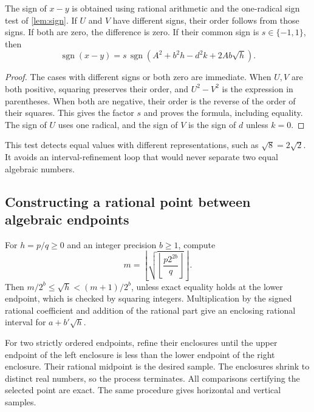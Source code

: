 \begin{lemma}\label{lem:two-radicals}
The sign of $x-y$ is obtained using rational arithmetic and the one-radical sign test of \cref{lem:sign}. If $U$ and $V$ have different signs, their order follows from those signs. If both are zero, the difference is zero. If their common sign is $s\in\{-1,1\}$, then
\begin{equation}\label{eq:two-radical-comparison}
\operatorname{sgn}(x-y)=s\,\operatorname{sgn}\left(A^2+b^2h-d^2k+2Ab\sqrt h\right).
\end{equation}
\end{lemma}
\begin{proof}
The cases with different signs or both zero are immediate. When $U,V$ are both positive, squaring preserves their order, and $U^2-V^2$ is the expression in parentheses. When both are negative, their order is the reverse of the order of their squares. This gives the factor $s$ and proves the formula, including equality. The sign of $U$ uses one radical, and the sign of $V$ is the sign of $d$ unless $k=0$.
\end{proof}

This test detects equal values with different representations, such as $\sqrt8=2\sqrt2$. It avoids an interval-refinement loop that would never separate two equal algebraic numbers.

\subsection{Constructing a rational point between algebraic endpoints}
For $h=p/q\ge0$ and an integer precision $b\ge1$, compute
\[
m=\left\lfloor\sqrt{\left\lfloor\frac{p2^{2b}}q\right\rfloor}\right\rfloor.
\]
Then $m/2^b\le\sqrt h<(m+1)/2^b$, unless exact equality holds at the lower endpoint, which is checked by squaring integers. Multiplication by the signed rational coefficient and addition of the rational part give an enclosing rational interval for $a+b'\sqrt h$.

For two strictly ordered endpoints, refine their enclosures until the upper endpoint of the left enclosure is less than the lower endpoint of the right enclosure. Their rational midpoint is the desired sample. The enclosures shrink to distinct real numbers, so the process terminates. All comparisons certifying the selected point are exact. The same procedure gives horizontal and vertical samples.

